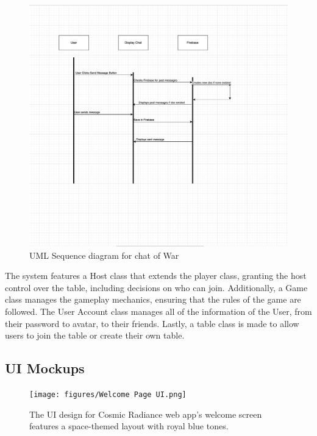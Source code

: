 \begin{figure}
    \centering
    \includegraphics[width=1\linewidth]{documentation/figures/Sequence UML .png}
    \caption{UML Sequence diagram for chat of War}
    \label{fig:enter-label}
\end{figure}

The system features a Host class that extends the player class, granting the host control over the table, including decisions on who can join. Additionally, a Game class manages the gameplay mechanics, ensuring that the rules of the game are followed. The User Account class manages all of the information of the User, from their password to avatar, to their friends. Lastly, a table class is made to allow users to join the table or create their own table.

\subsection {UI Mockups}
\begin{figure}
    \centering
    \texttt{[image: figures/Welcome Page UI.png]}
    \caption{The UI design for Cosmic Radiance web app's welcome screen features a space-themed layout with royal blue tones.}
    \label{fig:enter-label}
\end{figure}


